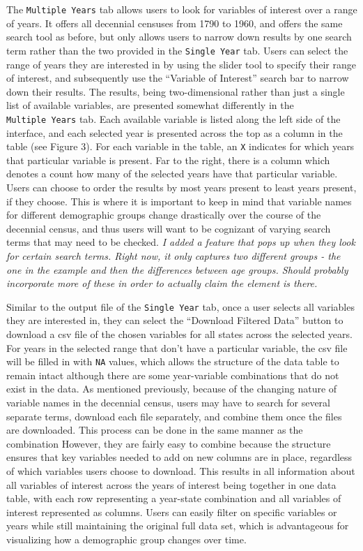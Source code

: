 \documentclass[11pt,]{article}
\begin{document}
The \texttt{Multiple\ Years} tab allows users to look for variables of
interest over a range of years. It offers all decennial censuses from
1790 to 1960, and offers the same search tool as before, but only allows
users to narrow down results by one search term rather than the two
provided in the \texttt{Single\ Year} tab. Users can select the range of
years they are interested in by using the slider tool to specify their
range of interest, and subsequently use the ``Variable of Interest''
search bar to narrow down their results. The results, being
two-dimensional rather than just a single list of available variables,
are presented somewhat differently in the \texttt{Multiple\ Years} tab.
Each available variable is listed along the left side of the interface,
and each selected year is presented across the top as a column in the
table (see Figure 3). For each variable in the table, an \texttt{X}
indicates for which years that particular variable is present. Far to
the right, there is a column which denotes a count how many of the
selected years have that particular variable. Users can choose to order
the results by most years present to least years present, if they
choose. This is where it is important to keep in mind that variable
names for different demographic groups change drastically over the
course of the decennial census, and thus users will want to be cognizant
of varying search terms that may need to be checked. \emph{I added a
feature that pops up when they look for certain search terms. Right now,
it only captures two different groups - the one in the example and then
the differences between age groups. Should probably incorporate more of
these in order to actually claim the element is there.}

Similar to the output file of the \texttt{Single\ Year} tab, once a user
selects all variables they are interested in, they can select the
``Download Filtered Data'' button to download a csv file of the chosen
variables for all states across the selected years. For years in the
selected range that don't have a particular variable, the csv file will
be filled in with \texttt{NA} values, which allows the structure of the
data table to remain intact although there are some year-variable
combinations that do not exist in the data. As mentioned previously,
because of the changing nature of variable names in the decennial
census, users may have to search for several separate terms, download
each file separately, and combine them once the files are downloaded.
This process can be done in the same manner as the combination However,
they are fairly easy to combine because the structure ensures that key
variables needed to add on new columns are in place, regardless of which
variables users choose to download. This results in all information
about all variables of interest across the years of interest being
together in one data table, with each row representing a year-state
combination and all variables of interest represented as columns. Users
can easily filter on specific variables or years while still maintaining
the original full data set, which is advantageous for visualizing how a
demographic group changes over time.
\end{document}
